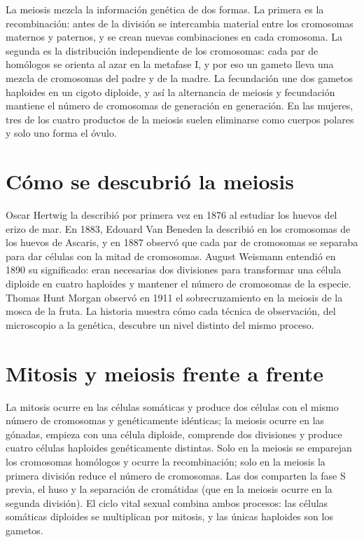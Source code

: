 \documentclass{book}
\begin{document}
La meiosis mezcla la información genética de dos formas. La primera es la recombinación: antes de la división se intercambia material entre los cromosomas maternos y paternos, y se crean nuevas combinaciones en cada cromosoma. La segunda es la distribución independiente de los cromosomas: cada par de homólogos se orienta al azar en la metafase I, y por eso un gameto lleva una mezcla de cromosomas del padre y de la madre. La fecundación une dos gametos haploides en un cigoto diploide, y así la alternancia de meiosis y fecundación mantiene el número de cromosomas de generación en generación. En las mujeres, tres de los cuatro productos de la meiosis suelen eliminarse como cuerpos polares y solo uno forma el óvulo.


\section{Cómo se descubrió la meiosis}

Oscar Hertwig la describió por primera vez en 1876 al estudiar los huevos del erizo de mar. En 1883, Edouard Van Beneden la describió en los cromosomas de los huevos de Ascaris, y en 1887 observó que cada par de cromosomas se separaba para dar células con la mitad de cromosomas. August Weismann entendió en 1890 su significado: eran necesarias dos divisiones para transformar una célula diploide en cuatro haploides y mantener el número de cromosomas de la especie. Thomas Hunt Morgan observó en 1911 el sobrecruzamiento en la meiosis de la mosca de la fruta. La historia muestra cómo cada técnica de observación, del microscopio a la genética, descubre un nivel distinto del mismo proceso.


\section{Mitosis y meiosis frente a frente}

La mitosis ocurre en las células somáticas y produce dos células con el mismo número de cromosomas y genéticamente idénticas; la meiosis ocurre en las gónadas, empieza con una célula diploide, comprende dos divisiones y produce cuatro células haploides genéticamente distintas. Solo en la meiosis se emparejan los cromosomas homólogos y ocurre la recombinación; solo en la meiosis la primera división reduce el número de cromosomas. Las dos comparten la fase S previa, el huso y la separación de cromátidas (que en la meiosis ocurre en la segunda división). El ciclo vital sexual combina ambos procesos: las células somáticas diploides se multiplican por mitosis, y las únicas haploides son los gametos.
\end{document}
